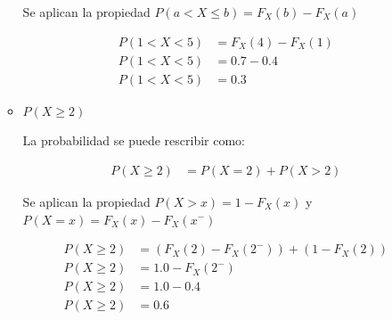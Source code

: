 \documentclass[a4paper,spanish]{article}
\begin{document}
\begin{enumerate}
\begin{itemize}
                    Se aplican la propiedad $P(a<X \leq b) = F_X(b) - F_X(a)$

                    \begin{align*}
                        P(1 < X < 5) & = F_X(4) - F_X(1) \\
                        P(1 < X < 5) & = 0.7 - 0.4       \\
                        P(1 < X < 5) & = 0.3
                    \end{align*}

              \item $P(X \geq 2)$

                    La probabilidad se puede rescribir como:

                    \begin{align*}
                        P(X \geq 2) & = P(X=2) + P(X>2)
                    \end{align*}

                    Se aplican la propiedad $P(X>x) = 1 - F_X(x)$ \; y \; ${P(X=x) = F_X(x) - F_X(x^-)}$

                    \begin{align*}
                        P(X \geq 2) & = (F_X(2) - F_X(2^-)) + (1 - F_X(2)) \\
                        P(X \geq 2) & = 1.0 - F_X(2^-)                     \\
                        P(X \geq 2) & = 1.0 - 0.4                          \\
                        P(X \geq 2) & = 0.6
                    \end{align*}
          \end{itemize}
\end{enumerate}
\end{document}
